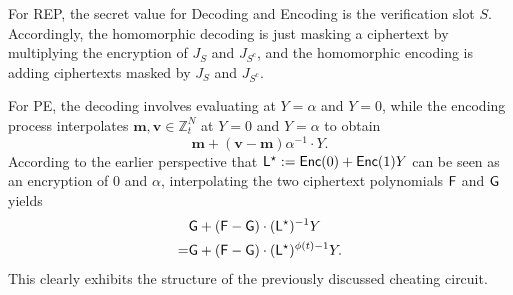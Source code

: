 \documentclass[runningheads]{llncs}
\newcommand{\REP}{\textsf{REP}{}}
\newcommand{\PE}{\textsf{PE}{}}
\newcommand{\enc}{\textsf{Enc}}
\begin{document}
        For \REP{}, the secret value for Decoding and Encoding is the verification slot $S$. Accordingly, the homomorphic decoding is just masking a ciphertext by multiplying the encryption of $J_S$ and $J_{S^c}$, and the homomorphic encoding is adding ciphertexts masked by $J_S$ and $J_{S^c}$.

        For \PE{}, the decoding involves evaluating at \(Y=\alpha\) and \(Y=0\), while the encoding process interpolates \(\mathbf{m}, \mathbf{v} \in \mathbb{Z}_t^N\) at \(Y=0\) and \(Y=\alpha\) to obtain
        \[
        \mathbf{m} + (\mathbf{v}-\mathbf{m})\alpha^{-1}\cdot Y.
        \]
        According to the earlier perspective that \( {\sf L}^\star := \enc(0) + \enc(1)Y \) can be seen as an encryption of \(0\) and \(\alpha\), interpolating the two ciphertext polynomials \({\sf F}\) and \({\sf G}\) yields
        \begin{align*}   
        &{\sf G}+({\sf F}-{\sf G})\cdot ({\sf L}^\star)^{-1}Y \\
        = &{\sf G}+({\sf F}-{\sf G})\cdot ({\sf L}^\star)^{\phi(t)-1}Y.
        \end{align*}
        This clearly exhibits the structure of the previously discussed cheating circuit.
            
    
        
\end{document}
